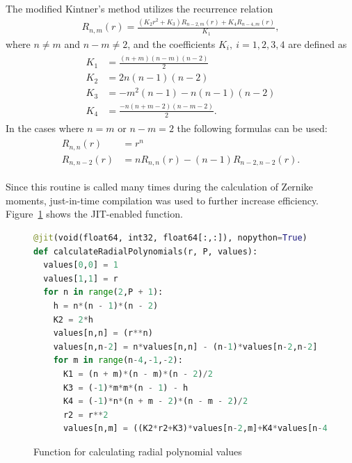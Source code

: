 The modified Kintner's method utilizes the recurrence relation
\begin{gather*}
    R_{n,m}(r) =  \frac{(K_2r^2 + K_3)R_{n-2,m}(r) + K_4R_{n-4,m}(r)}{K_1},
\end{gather*}
where $n \neq m$ and $n - m \neq 2$, and the coefficients $K_i, \ i = 1,2,3,4$ are defined as
\begin{gather*}
    \begin{split}
        K_1 &= \frac{(n + m)(n - m)(n - 2)}{2}\\
        K_2 &= 2n(n-1)(n-2)\\
        K_3 &= -m^2(n-1)-n(n-1)(n-2)\\
        K_4 &= \frac{-n(n + m - 2)(n - m - 2)}{2}.
    \end{split}
\end{gather*}
In the cases where $n = m$ or $ n - m = 2$ the following formulas can be used:
\begin{gather*}
    \begin{split}
        R_{n,n}(r) &= r^n\\
        R_{n,n - 2}(r) &= nR_{n,n}(r) - (n - 1)R_{n-2,n-2}(r).
    \end{split}
\end{gather*}


Since this routine is called many times during the calculation of Zernike moments, just-in-time compilation was used to further increase efficiency. Figure~\ref{fig:radial_code} shows the JIT-enabled function.

\begin{figure}[tbp]
    \centering
    \begin{lstlisting}[language=Python]
@jit(void(float64, int32, float64[:,:]), nopython=True)
def calculateRadialPolynomials(r, P, values):
  values[0,0] = 1
  values[1,1] = r
  for n in range(2,P + 1):
    h = n*(n - 1)*(n - 2)
    K2 = 2*h
    values[n,n] = (r**n)
    values[n,n-2] = n*values[n,n] - (n-1)*values[n-2,n-2]
    for m in range(n-4,-1,-2):			
      K1 = (n + m)*(n - m)*(n - 2)/2
      K3 = (-1)*m*m*(n - 1) - h
      K4 = (-1)*n*(n + m - 2)*(n - m - 2)/2
      r2 = r**2
      values[n,m] = ((K2*r2+K3)*values[n-2,m]+K4*values[n-4,m])/K1\end{lstlisting}
    \caption{Function for calculating radial polynomial values}
    \label{fig:radial_code}
\end{figure}

